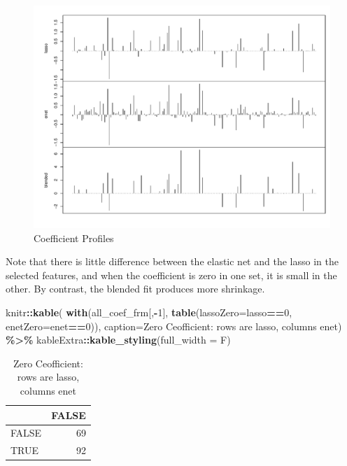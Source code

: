 \documentclass[
]{book}
\newenvironment{Shaded}{\begin{snugshade}}{\end{snugshade}}
\newcommand{\DataTypeTok}[1]{\textcolor[rgb]{0.13,0.29,0.53}{#1}}
\newcommand{\DecValTok}[1]{\textcolor[rgb]{0.00,0.00,0.81}{#1}}
\newcommand{\KeywordTok}[1]{\textcolor[rgb]{0.13,0.29,0.53}{\textbf{#1}}}
\newcommand{\NormalTok}[1]{#1}
\newcommand{\OperatorTok}[1]{\textcolor[rgb]{0.81,0.36,0.00}{\textbf{#1}}}
\newcommand{\StringTok}[1]{\textcolor[rgb]{0.31,0.60,0.02}{#1}}
\begin{document}
\begin{figure}
\centering
\includegraphics{Static/figures/hcc5hmC-glmnetFit-compCoeffProf-1.pdf}
\caption{\label{fig:hcc5hmC-glmnetFit-compCoeffProf}Coefficient Profiles}
\end{figure}

Note that there is little difference between the elastic net and the lasso
in the selected features, and when the coefficient is zero in one set, it
is small in the other. By contrast, the blended fit produces more shrinkage.

\begin{Shaded}
\begin{Highlighting}[]
\NormalTok{knitr}\OperatorTok{::}\KeywordTok{kable}\NormalTok{(}
\KeywordTok{with}\NormalTok{(all\_coef\_frm[,}\OperatorTok{{-}}\DecValTok{1}\NormalTok{], }\KeywordTok{table}\NormalTok{(}\DataTypeTok{lassoZero=}\NormalTok{lasso}\OperatorTok{==}\DecValTok{0}\NormalTok{, }\DataTypeTok{enetZero=}\NormalTok{enet}\OperatorTok{==}\DecValTok{0}\NormalTok{)),}
 \DataTypeTok{caption=}\StringTok{\textquotesingle{}Zero Ceofficient: rows are lasso, columns enet\textquotesingle{}}\NormalTok{) }\OperatorTok{\%>\%}
\StringTok{  }\NormalTok{kableExtra}\OperatorTok{::}\KeywordTok{kable\_styling}\NormalTok{(}\DataTypeTok{full\_width =}\NormalTok{ F)}
\end{Highlighting}
\end{Shaded}

\begin{table}

\caption{\label{tab:hcc5hmC-glmnetFit-zreros}Zero Ceofficient: rows are lasso, columns enet}
\centering
\begin{tabular}[t]{l|r}
\hline
  & FALSE\\
\hline
FALSE & 69\\
\hline
TRUE & 92\\
\hline
\end{tabular}
\end{table}
\end{document}
